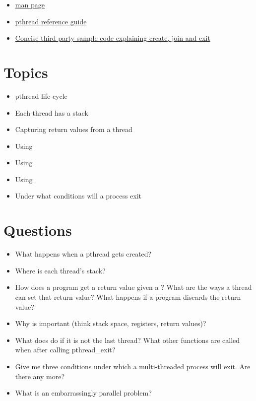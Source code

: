 \begin{itemize}
\item \href{http://man7.org/linux/man-pages/man3/pthread_create.3.html}{man page}
\item \href{http://man7.org/linux/man-pages/man7/pthreads.7.html}{pthread reference guide}
\item \href{http://www.thegeekstuff.com/2012/04/terminate-c-thread/}{Concise third party sample code explaining create, join and exit}
\end{itemize}

\section{Topics}

\begin{itemize}
\tightlist
\item
pthread life-cycle
\item
Each thread has a stack
\item
Capturing return values from a thread
\item
Using 
\item
Using 
\item
Using 
\item
Under what conditions will a process exit
\end{itemize}

\section{Questions}

\begin{itemize}
\tightlist
\item
What happens when a pthread gets created?
\item
Where is each thread's stack?
\item
How does a program get a return value given a ? What are the ways a thread can set that return value? What happens if a program discards the return value?
\item
Why is  important (think stack space, registers, return values)?
\item
What does  do if it is not the last thread? What other functions are called when after calling pthread\_exit?
\item
Give me three conditions under which a multi-threaded process will exit. Are there any more?
\item
What is an embarrassingly parallel problem?
\end{itemize}



